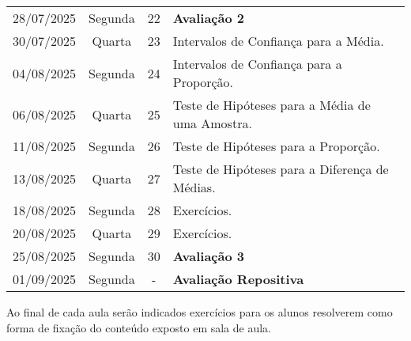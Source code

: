 \documentclass[11pt,a4paper]{report}
\begin{document}
\begin{table}[H]
\begin{tabular}{|c|c|c|p{10cm}|}
		28/07/2025 & Segunda & 22 & \textbf{Avaliação 2}\\
		30/07/2025 & Quarta & 23 & Intervalos de Confiança para a Média.\\
		04/08/2025 & Segunda & 24 & Intervalos de Confiança para a Proporção.\\
		06/08/2025 & Quarta & 25 & Teste de Hipóteses para a Média de uma Amostra.\\
		11/08/2025 & Segunda & 26 & Teste de Hipóteses para a Proporção.\\
		13/08/2025 & Quarta & 27 & Teste de Hipóteses para a Diferença de Médias.\\
		18/08/2025 & Segunda & 28 & Exercícios.\\
		20/08/2025 & Quarta & 29 & Exercícios.\\
		25/08/2025 & Segunda & 30 & \textbf{Avaliação 3} \\
		01/09/2025 & Segunda & - & \textbf{Avaliação Repositiva} \\
		\bottomrule
	\end{tabular}
\end{table}

 Ao final de cada aula serão indicados exercícios para os alunos resolverem como forma de fixação do conteúdo exposto em sala de aula.
\end{document}
